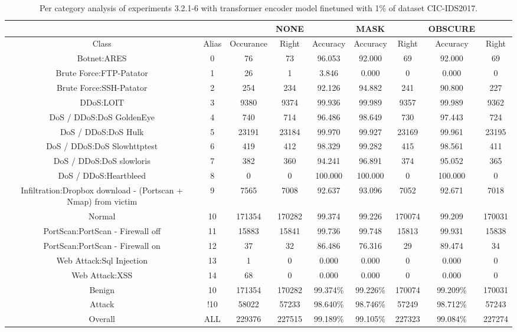 \begin{table}[htb]
    \centering
    \begin{tabular}{@{}ccccccccc@{}}
        \toprule
         &  &  & NONE &  & MASK &  & OBSCURE &  \\
        \midrule
        Class &  Alias &  Occurance &  Right &  Accuracy &  Accuracy &  Right &  Accuracy &  Right \\
        Botnet:ARES &  0 &  76 &  73 &  96.053 &  92.000 &  69 &  92.000 &  69 \\
        Brute Force:FTP-Patator &  1 &  26 &  1 &  3.846 &  0.000 &  0 &  0.000 &  0 \\
        Brute Force:SSH-Patator &  2 &  254 &  234 &  92.126 &  94.882 &  241 &  90.800 &  227 \\
        DDoS:LOIT &  3 &  9380 &  9374 &  99.936 &  99.989 &  9357 &  99.989 &  9362 \\
        DoS / DDoS:DoS GoldenEye &  4 &  740 &  714 &  96.486 &  98.649 &  730 &  97.443 &  724 \\
        DoS / DDoS:DoS Hulk &  5 &  23191 &  23184 &  99.970 &  99.927 &  23169 &  99.961 &  23195 \\
        DoS / DDoS:DoS Slowhttptest &  6 &  419 &  412 &  98.329 &  99.282 &  415 &  98.561 &  411 \\
        DoS / DDoS:DoS slowloris &  7 &  382 &  360 &  94.241 &  96.891 &  374 &  95.052 &  365 \\
        DoS / DDoS:Heartbleed &  8 &  0 &  0 &  100.000 &  100.000 &  0 &  100.000 &  0 \\
        Infiltration:Dropbox download - (Portscan + Nmap) from victim &  9 &  7565 &  7008 &  92.637 &  93.096 &  7052 &  92.671 &  7018 \\
        Normal &  10 &  171354 &  170282 &  99.374 &  99.226 &  170074 &  99.209 &  170031 \\
        PortScan:PortScan - Firewall off &  11 &  15883 &  15841 &  99.736 &  99.748 &  15813 &  99.931 &  15838 \\
        PortScan:PortScan - Firewall on &  12 &  37 &  32 &  86.486 &  76.316 &  29 &  89.474 &  34 \\
        Web Attack:Sql Injection &  13 &  1 &  0 &  0.000 &  0.000 &  0 &  0.000 &  0 \\
        Web Attack:XSS &  14 &  68 &  0 &  0.000 &  0.000 &  0 &  0.000 &  0 \\
        Benign &  10 &  171354 &  170282 &  99.374\% &  99.226\% &  170074 &  99.209\% &  170031 \\
        Attack &  !10 &  58022 &  57233 &  98.640\% &  98.746\% &  57249 &  98.712\% &  57243 \\
        Overall &  ALL &  229376 &  227515 &  99.189\% &  99.105\% &  227323 &  99.084\% &  227274 \\
        \bottomrule
    \end{tabular}
    \caption{Per category analysis of experiments 3.2.1-6 with transformer encoder model finetuned with 1\% of dataset CIC-IDS2017.}
    \label{table:results:lstm:class_flows_1}
\end{table}